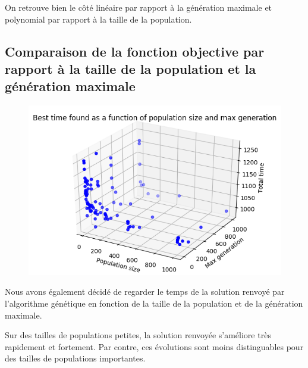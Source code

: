 On retrouve bien le côté linéaire par rapport à la génération maximale et polynomial par rapport à la taille de la population.

\newpage

\subsection{Comparaison de la fonction objective par rapport à la taille de la population et la génération maximale}

\begin{figure}[!h]
    \centering
    \includegraphics[]{report/Pictures/setb4c9_benchmarks_generation_with_solution_time.png}
\end{figure}

Nous avons également décidé de regarder le temps de la solution renvoyé par l'algorithme génétique en fonction de la taille de la population et de la génération maximale.

Sur des tailles de populations petites, la solution renvoyée s'améliore très rapidement et fortement. Par contre, ces évolutions sont moins distinguables pour des tailles de populations importantes.

\newpage